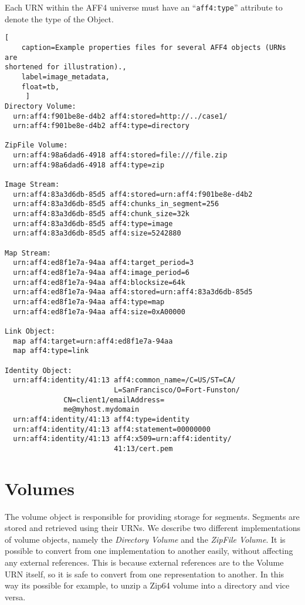 \documentclass[10pt, conference]{IEEEtran}
\begin{document}
Each URN within the AFF4 universe must have an ``\texttt{aff4:type}''
attribute to denote the type of the Object.

\begin{lstlisting}[
	caption=Example properties files for several AFF4 objects (URNs are
shortened for illustration).,
	label=image_metadata,
	float=tb,
	 ]
Directory Volume:
  urn:aff4:f901be8e-d4b2 aff4:stored=http://../case1/
  urn:aff4:f901be8e-d4b2 aff4:type=directory

ZipFile Volume:
  urn:aff4:98a6dad6-4918 aff4:stored=file:///file.zip
  urn:aff4:98a6dad6-4918 aff4:type=zip

Image Stream:
  urn:aff4:83a3d6db-85d5 aff4:stored=urn:aff4:f901be8e-d4b2
  urn:aff4:83a3d6db-85d5 aff4:chunks_in_segment=256
  urn:aff4:83a3d6db-85d5 aff4:chunk_size=32k
  urn:aff4:83a3d6db-85d5 aff4:type=image
  urn:aff4:83a3d6db-85d5 aff4:size=5242880

Map Stream:
  urn:aff4:ed8f1e7a-94aa aff4:target_period=3
  urn:aff4:ed8f1e7a-94aa aff4:image_period=6
  urn:aff4:ed8f1e7a-94aa aff4:blocksize=64k
  urn:aff4:ed8f1e7a-94aa aff4:stored=urn:aff4:83a3d6db-85d5
  urn:aff4:ed8f1e7a-94aa aff4:type=map
  urn:aff4:ed8f1e7a-94aa aff4:size=0xA00000

Link Object:
  map aff4:target=urn:aff4:ed8f1e7a-94aa
  map aff4:type=link

Identity Object:
  urn:aff4:identity/41:13 aff4:common_name=/C=US/ST=CA/
                          L=SanFrancisco/O=Fort-Funston/
			  CN=client1/emailAddress=
			  me@myhost.mydomain
  urn:aff4:identity/41:13 aff4:type=identity
  urn:aff4:identity/41:13 aff4:statement=00000000
  urn:aff4:identity/41:13 aff4:x509=urn:aff4:identity/
                          41:13/cert.pem
\end{lstlisting}

\section{Volumes}
The volume object is responsible for providing storage for
segments. Segments are stored and retrieved using their URNs. We
describe two different implementations of volume objects, namely the
{\em Directory Volume} and the {\em ZipFile Volume}. It is possible to
convert from one implementation to another easily, without affecting
any external references. This is because external references are to
the Volume URN itself, so it is safe to convert from one
representation to another. In this way its possible for example, to
unzip a Zip64 volume into a directory and vice versa.
\end{document}
